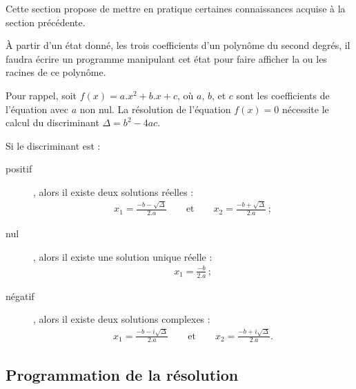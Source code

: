 
Cette section propose de mettre en pratique certaines
connaissances acquise à la section précédente.

À partir d'un état donné, les trois coefficients d'un polynôme
du second degrés, il faudra écrire un programme manipulant
cet état pour faire afficher la ou les racines de ce
polynôme.

Pour rappel, soit  $f(x) = a.x^2+b.x+c$, où $a$, $b$, et $c$ sont les 
 coefficients   de  l'équation  avec  $a$
 non nul. La résolution de l'équation $f(x) = 0$
 nécessite le calcul du
 discriminant $\Delta =  b^2-4ac$.

 Si  le 
discriminant est :
\begin{description}
\item[positif], alors il existe deux solutions réelles :
\begin{eqnarray*}
  x_1   =  \frac{-b-\sqrt{\Delta}}{2.a}   \qquad  \textrm{et}   \qquad
  x_2=\frac{-b+\sqrt{\Delta}}{2.a}\,;
\end{eqnarray*}
\item[nul], alors il existe une solution unique réelle :
\begin{eqnarray*}
  x_1 = \frac{-b}{2.a}\,;
\end{eqnarray*}
\item[négatif], alors il existe deux solutions complexes :
\begin{eqnarray*}
  x_1  =   \frac{-b-i\sqrt{\Delta}}{2.a}  \qquad   \textrm{et}  \qquad
  x_2=\frac{-b+i\sqrt{\Delta}}{2.a}.
\end{eqnarray*}
\end{description}

\subsection{Programmation de la résolution}



